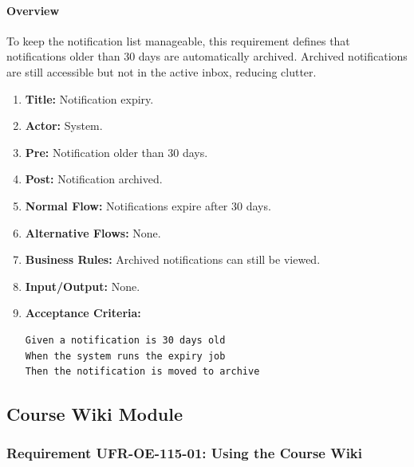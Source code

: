 \paragraph{Overview}
To keep the notification list manageable, this requirement defines that notifications older than 30 days are automatically archived. Archived notifications are still accessible but not in the active inbox, reducing clutter.
\begin{enumerate}[label=\textbf{\arabic*.}]
\item \textbf{Title:} Notification expiry.
\item \textbf{Actor:} System.
\item \textbf{Pre:} Notification older than 30 days.
\item \textbf{Post:} Notification archived.
\item \textbf{Normal Flow:} Notifications expire after 30 days.
\item \textbf{Alternative Flows:} None.
\item \textbf{Business Rules:} Archived notifications can still be viewed.
\item \textbf{Input/Output:} None.
\item \textbf{Acceptance Criteria:}
    \begin{verbatim}
Given a notification is 30 days old
When the system runs the expiry job
Then the notification is moved to archive
    \end{verbatim}
\end{enumerate}

\subsection{Course Wiki Module}
\subsubsection{Requirement UFR-OE-115-01: Using the Course Wiki}
